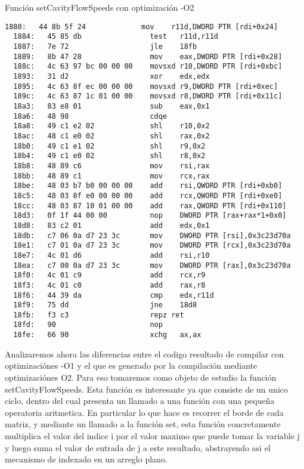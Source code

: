 ~\\
~\\
{\center\large{Función setCavityFlowSpeeds con optimización -O2}}
\begin{lstlisting}[]
  1880:   44 8b 5f 24             mov    r11d,DWORD PTR [rdi+0x24]
  1884:   45 85 db                test   r11d,r11d
  1887:   7e 72                   jle    18fb
  1889:   8b 47 28                mov    eax,DWORD PTR [rdi+0x28]
  188c:   4c 63 97 bc 00 00 00    movsxd r10,DWORD PTR [rdi+0xbc]
  1893:   31 d2                   xor    edx,edx
  1895:   4c 63 8f ec 00 00 00    movsxd r9,DWORD PTR [rdi+0xec]
  189c:   4c 63 87 1c 01 00 00    movsxd r8,DWORD PTR [rdi+0x11c]
  18a3:   83 e8 01                sub    eax,0x1
  18a6:   48 98                   cdqe   
  18a8:   49 c1 e2 02             shl    r10,0x2
  18ac:   48 c1 e0 02             shl    rax,0x2
  18b0:   49 c1 e1 02             shl    r9,0x2
  18b4:   49 c1 e0 02             shl    r8,0x2
  18b8:   48 89 c6                mov    rsi,rax
  18bb:   48 89 c1                mov    rcx,rax
  18be:   48 03 b7 b0 00 00 00    add    rsi,QWORD PTR [rdi+0xb0]
  18c5:   48 03 8f e0 00 00 00    add    rcx,QWORD PTR [rdi+0xe0]
  18cc:   48 03 87 10 01 00 00    add    rax,QWORD PTR [rdi+0x110]
  18d3:   0f 1f 44 00 00          nop    DWORD PTR [rax+rax*1+0x0]
  18d8:   83 c2 01                add    edx,0x1
  18db:   c7 06 0a d7 23 3c       mov    DWORD PTR [rsi],0x3c23d70a
  18e1:   c7 01 0a d7 23 3c       mov    DWORD PTR [rcx],0x3c23d70a
  18e7:   4c 01 d6                add    rsi,r10
  18ea:   c7 00 0a d7 23 3c       mov    DWORD PTR [rax],0x3c23d70a
  18f0:   4c 01 c9                add    rcx,r9
  18f3:   4c 01 c0                add    rax,r8
  18f6:   44 39 da                cmp    edx,r11d
  18f9:   75 dd                   jne    18d8
  18fb:   f3 c3                   repz ret 
  18fd:   90                      nop
  18fe:   66 90                   xchg   ax,ax
\end{lstlisting}

Analizaremos ahora las diferencias entre el codigo resultado de compilar con optimizaciónes -O1 y el que es generado por la compilación mediante optimizaciónes O2. Para eso tomaremos como objeto de estudio la función setCavityFlowSpeeds. Esta función es interesante ya que consiste de un unico ciclo, dentro del cual presenta un llamado a una función con una pequeña operatoria aritmetica. En particular lo que hace es recorrer el borde de cada matriz, y mediante un llamado a la función set, esta función concretamente multiplica el valor del indice i por el valor maximo que puede tomar la variable j y luego suma el valor de entrada de j a este resultado, abstrayendo asi el mecanismo de indexado en un arreglo plano.  
~\\
~\\

